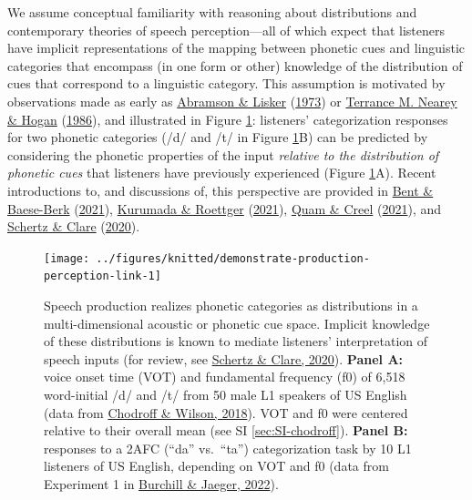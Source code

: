 \documentclass[
  11pt,
  english,
  man,floatsintext]{apa6}
\begin{document}
We assume conceptual familiarity with reasoning about distributions and contemporary theories of speech perception---all of which expect that listeners have implicit representations of the mapping between phonetic cues and linguistic categories that encompass (in one form or other) knowledge of the distribution of cues that correspond to a linguistic category. This assumption is motivated by observations made as early as \protect\hyperlink{ref-abramson1973voice}{Abramson \& Lisker} (\protect\hyperlink{ref-abramson1973voice}{1973}) or \protect\hyperlink{ref-nearey-hogan1986}{Terrance M. Nearey \& Hogan} (\protect\hyperlink{ref-nearey-hogan1986}{1986}), and illustrated in Figure \ref{fig:demonstrate-production-perception-link}: listeners' categorization responses for two phonetic categories (/d/ and /t/ in Figure \ref{fig:demonstrate-production-perception-link}B) can be predicted by considering the phonetic properties of the input \emph{relative to the distribution of phonetic cues} that listeners have previously experienced (Figure \ref{fig:demonstrate-production-perception-link}A). Recent introductions to, and discussions of, this perspective are provided in \protect\hyperlink{ref-bent-baeseberk2021}{Bent \& Baese-Berk} (\protect\hyperlink{ref-bent-baeseberk2021}{2021}), \protect\hyperlink{ref-kurumada-roettger2021}{Kurumada \& Roettger} (\protect\hyperlink{ref-kurumada-roettger2021}{2021}), \protect\hyperlink{ref-quam-creel2021}{Quam \& Creel} (\protect\hyperlink{ref-quam-creel2021}{2021}), and \protect\hyperlink{ref-schertz-clare2020}{Schertz \& Clare} (\protect\hyperlink{ref-schertz-clare2020}{2020}).



\begin{figure}

{\centering \texttt{[image: ../figures/knitted/demonstrate-production-perception-link-1]} 

}

\caption{Speech production realizes phonetic categories as distributions in a multi-dimensional acoustic or phonetic cue space. Implicit knowledge of these distributions is known to mediate listeners' interpretation of speech inputs (for review, see \protect\hyperlink{ref-schertz-clare2020}{Schertz \& Clare, 2020}). \textbf{Panel A:} voice onset time (VOT) and fundamental frequency (f0) of 6,518 word-initial /d/ and /t/ from 50 male L1 speakers of US English (data from \protect\hyperlink{ref-chodroff-wilson2018}{Chodroff \& Wilson, 2018}). VOT and f0 were centered relative to their overall mean (see SI \ref{sec:SI-chodroff}). \textbf{Panel B:} responses to a 2AFC (``da'' vs.~``ta'') categorization task by 10 L1 listeners of US English, depending on VOT and f0 (data from Experiment 1 in \protect\hyperlink{ref-burchill-jaeger2022}{Burchill \& Jaeger, 2022}).}\label{fig:demonstrate-production-perception-link}
\end{figure}
\end{document}
